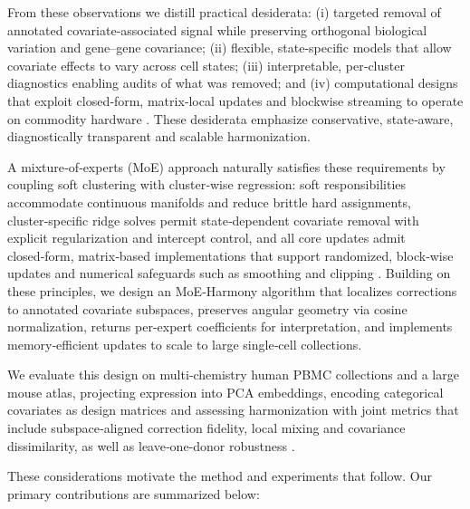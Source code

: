 \documentclass{article}
\begin{document}
From these observations we distill practical desiderata: (i) targeted removal of annotated covariate‑associated signal while preserving orthogonal biological variation and gene–gene covariance; (ii) flexible, state‑specific models that allow covariate effects to vary across cell states; (iii) interpretable, per‑cluster diagnostics enabling audits of what was removed; and (iv) computational designs that exploit closed‑form, matrix‑local updates and blockwise streaming to operate on commodity hardware \citep{Zhang2019DefiningIC,Nicol2023RobustIO,Andreatta2020ProjectingST,Leek2007CapturingHI}. These desiderata emphasize conservative, state‑aware, diagnostically transparent and scalable harmonization.

A mixture‑of‑experts (MoE) approach naturally satisfies these requirements by coupling soft clustering with cluster‑wise regression: soft responsibilities accommodate continuous manifolds and reduce brittle hard assignments, cluster‑specific ridge solves permit state‑dependent covariate removal with explicit regularization and intercept control, and all core updates admit closed‑form, matrix‑based implementations that support randomized, block‑wise updates and numerical safeguards such as smoothing and clipping \citep{Dhillon2004ConceptDF,Zhang2023SynEcoSysAM}. Building on these principles, we design an MoE‑Harmony algorithm that localizes corrections to annotated covariate subspaces, preserves angular geometry via cosine normalization, returns per‑expert coefficients for interpretation, and implements memory‑efficient updates to scale to large single‑cell collections.

We evaluate this design on multi‑chemistry human PBMC collections and a large mouse atlas, projecting expression into PCA embeddings, encoding categorical covariates as design matrices and assessing harmonization with joint metrics that include subspace‑aligned correction fidelity, local mixing and covariance dissimilarity, as well as leave‑one‑donor robustness \citep{Zheng2016MassivelyPD,Arazi2019TheIC,PijuanSala2019ASM,Manno2018RNAVO,Segerstolpe2016SingleCellTP,Ritchie2015limmaPD}.

These considerations motivate the method and experiments that follow. Our primary contributions are summarized below:
\end{document}
